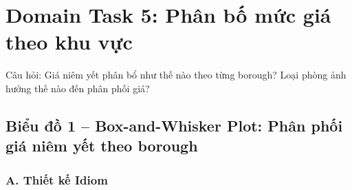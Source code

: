 ﻿\section{Domain Task 5: Phân bố mức giá theo khu vực}

Câu hỏi: Giá niêm yết phân bổ như thế nào theo từng borough? Loại phòng
ảnh hưởng thế nào đến phân phối giá?

\subsection{Biểu đồ 1 -- Box-and-Whisker Plot: Phân phối giá niêm yết theo borough}

\subsubsection*{A. Thiết kế Idiom}

